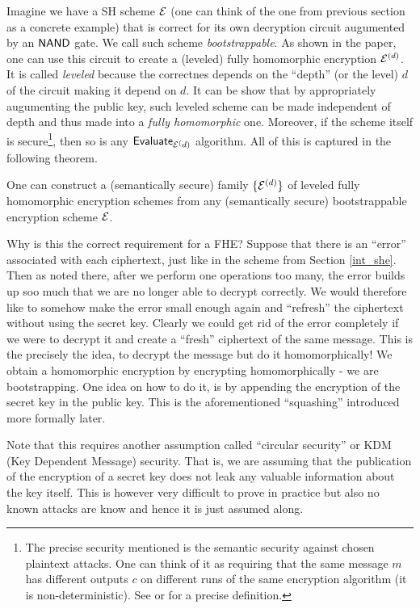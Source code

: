 Imagine we have a SH scheme $\mathcal{E}$ (one can think of the one from previous section as a concrete example) that is correct for its own decryption circuit augumented by an $\alg{NAND}$ gate. We call such scheme \textit{bootstrappable}. As shown in the paper, one can use this circuit to create a (leveled) fully homomorphic encryption $\mathcal{E}^{(d)}$. It is called \textit{leveled} because the correctnes depends on the ``depth'' (or the level) $d$ of the circuit making it depend on $d$. It can be show that by appropriately augumenting the public key, such leveled scheme can be made independent of depth and thus made into a \textit{fully homomorphic} one. Moreover, if the scheme itself is secure\footnote{The precise security mentioned is the semantic security against chosen plaintext attacks. One can think of it as requiring that the same message $m$ has different outputs $c$ on different runs of the same encryption algorithm (it is non-deterministic). See \cite{katz} or \cite{lattice-survey} for a precise definition.}, then so is any $\alg{Evaluate}_{\E^(d)}$ algorithm. All of this is captured in the following theorem.

\begin{theorem}
  One can construct a (semantically secure) family $\{ \mathcal{E}^{(d)} \}$ of leveled fully homomorphic encryption schemes from any (semantically secure) bootstrappable encryption scheme $\mathcal{E}$.
\end{theorem}

Why is this the correct requirement for a FHE? Suppose that there is an ``error'' associated with each ciphertext, just like in the scheme from Section \ref{int_she}. Then as noted there, after we perform one operations too many, the error builds up soo much that we are no longer able to decrypt correctly. We would therefore like to somehow make the error small enough again and ``refresh'' the ciphertext without using the secret key. Clearly we could get rid of the error completely if we were to decrypt it and create a ``fresh'' ciphertext of the same message. This is the precisely the idea, to decrypt the message but do it homomorphically! We obtain a homomorphic encryption by encrypting homomorphically - we are bootstrapping. One idea on how to do it, is by appending the encryption of the secret key in the public key. This is the aforementioned ``squashing'' introduced more formally later.

\begin{remark}
Note that this requires another assumption called ``circular security'' or KDM (Key Dependent Message) security. That is, we are assuming that the publication of the encryption of a secret key does not leak any valuable information about the key itself. This is however very difficult to prove in practice but also no known attacks are know and hence it is just assumed along.
\end{remark}

